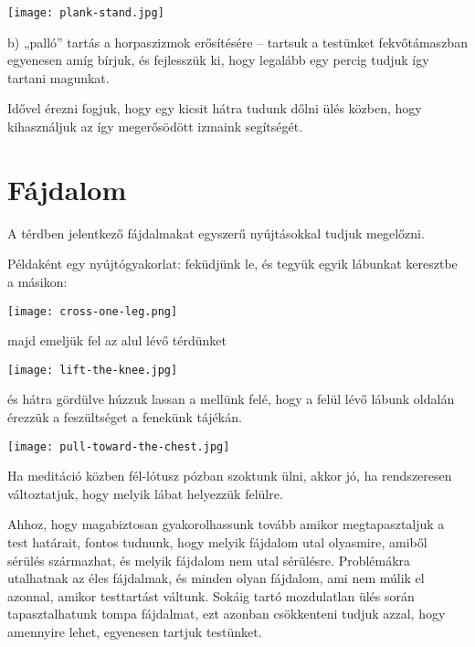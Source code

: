 \documentclass[12pt,oneside,landscape,final]{memoir}
\begin{document}
{\centering\par
\texttt{[image: plank-stand.jpg]}%
\par}

b) „palló” tartás a horpaszizmok erősítésére – tartsuk a testünket
fekvőtámaszban egyenesen amíg bírjuk, és fejlesszük ki, hogy legalább egy percig
tudjuk így tartani magunkat.

Idővel érezni fogjuk, hogy egy kicsit hátra tudunk dőlni ülés közben, hogy
kihasználjuk az így megerősödött izmaink segítségét.

\section{Fájdalom}

A térdben jelentkező fájdalmakat egyszerű nyújtásokkal tudjuk megelőzni.

\clearpage

Példaként egy nyújtógyakorlat: feküdjünk le, és tegyük egyik lábunkat keresztbe
a másikon:

{\centering\par
\texttt{[image: cross-one-leg.png]}%
\par}

majd emeljük fel az alul lévő térdünket

{\centering\par
\texttt{[image: lift-the-knee.jpg]}%
\par}

és hátra gördülve húzzuk lassan a mellünk felé, hogy a felül lévő lábunk oldalán
érezzük a feszültséget a fenekünk tájékán.

{\centering\par
\texttt{[image: pull-toward-the-chest.jpg]}%
\par}

Ha meditáció közben fél-lótusz pózban szoktunk ülni, akkor jó, ha rendszeresen
változtatjuk, hogy melyik lábat helyezzük felülre.

Ahhoz, hogy magabiztosan gyakorolhassunk tovább amikor megtapasztaljuk a test
határait, fontos tudnunk, hogy melyik fájdalom utal olyasmire, amiből sérülés
származhat, és melyik fájdalom nem utal sérülésre. Problémákra utalhatnak az
éles fájdalmak, és minden olyan fájdalom, ami nem múlik el azonnal, amikor
testtartást váltunk. Sokáig tartó mozdulatlan ülés során tapasztalhatunk tompa
fájdalmat, ezt azonban csökkenteni tudjuk azzal, hogy amennyire lehet, egyenesen
tartjuk testünket.
\end{document}
